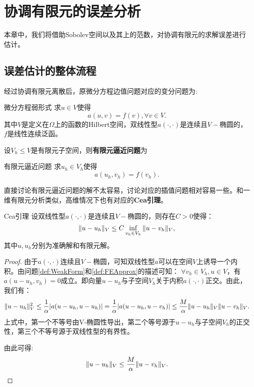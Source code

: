 \chapter{协调有限元的误差分析}
本章中，我们将借助Sobolev空间以及其上的范数，对协调有限元的求解误差进行估计。
\section{误差估计的整体流程}
经过协调有限元离散后，原微分方程边值问题对应的变分问题为:
\begin{definition}{微分方程弱形式}
    \label{def:WeakForm}
    求$u\in V$使得
    \begin{equation}
        a(u,v)=f(v),\forall v\in V.
    \end{equation}
    其中$V$是定义在$\Omega$上的函数的Hilbert空间，双线性型$a(\cdot,\cdot)$是连续且$V-$椭圆的，$f$是线性连续泛函。
\end{definition}
设$V_{h}\le V$是有限元子空间，则\textbf{有限元逼近问题}为
\begin{definition}{有限元逼近问题}
    \label{def:FEApprox}
    求$u_{h}\in V_{h}$使得
    \begin{equation}
        a(u_{h},v_{h})=f(v_{h}).
    \end{equation}
\end{definition}
直接讨论有限元逼近问题的解不太容易，讨论对应的插值问题相对容易一些。和一维有限元分析类似，高维情况下也有对应的\textbf{Cea引理}。
\begin{lemma}{Cea引理}
    \label{lem:Cea}
    设双线性型$a(\cdot,\cdot)$是连续且$V-$椭圆的，则存在$C>0$使得：
    \begin{equation}
        \|u-u_{h}\|_{V}\le C\inf_{v_{h}\in V_{h}}\|u-v_{h}\|_{V},
    \end{equation}
    其中$u,u_{h}$分别为准确解和有限元解。
\end{lemma}
\begin{proof}
    由于$a(\cdot,\cdot)$连续且$V-$椭圆，可知双线性型$a$可以在空间$V$上诱导一个内积。由问题\ref{def:WeakForm}和\ref{def:FEApprox}的描述可知：
    $\forall v_{h}\in V_{h},u\in V$，有$a(u-u_{h},v_{h})=0$成立。即向量$u-u_{h}$与子空间$V_{h}$关于内积$a(\cdot,\cdot)$正交。由此，我们有：
    \begin{equation}
        \|u-u_{h}\|_{V}^{2}\le\frac{1}{\alpha}|a(u-u_{h},u-u_{h})|=\frac{1}{\alpha}|a(u-u_{h},u-v_{h})|\le\frac{M}{\alpha}\|u-u_{h}\|_{V}\|u-v_{h}\|_{V}.
    \end{equation}
    上式中，第一个不等号由V-椭圆性导出，第二个等号源于$u-u_{h}$与子空间$V_{h}$的正交性，第三个不等号源于双线性型的有界性。

    由此可得:
    \begin{equation}
        \|u-u_{h}\|_{V}\le\frac{M}{\alpha}\|u-v_{h}\|_{V}.
    \end{equation}
\end{proof}
